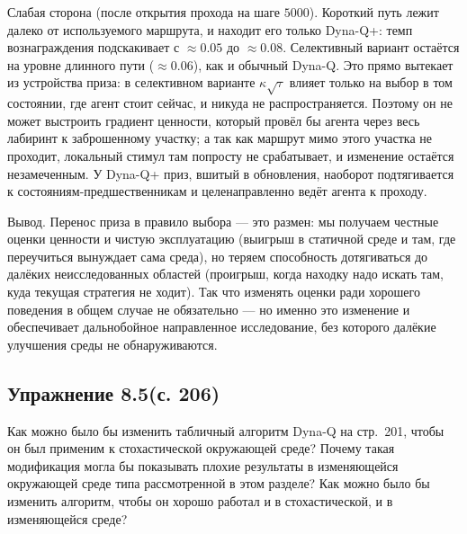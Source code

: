 \begin{solution}
    Слабая сторона (после открытия прохода на шаге $5000$). Короткий путь лежит
    далеко от используемого маршрута, и находит его только Dyna-Q+: темп
    вознаграждения подскакивает с $\approx 0.05$ до $\approx 0.08$. Селективный
    вариант остаётся на уровне длинного пути ($\approx 0.06$), как и обычный
    Dyna-Q. Это прямо вытекает из устройства приза: в селективном варианте
    $\kappa\sqrt{\tau}$ влияет только на выбор в том состоянии, где агент стоит
    сейчас, и никуда не распространяется. Поэтому он не может выстроить градиент
    ценности, который провёл бы агента через весь лабиринт к заброшенному
    участку; а так как маршрут мимо этого участка не проходит, локальный стимул
    там попросту не срабатывает, и изменение остаётся незамеченным. У Dyna-Q+
    приз, вшитый в обновления, наоборот подтягивается к состояниям-предшественникам
    и целенаправленно ведёт агента к проходу.

    Вывод. Перенос приза в правило выбора --- это размен: мы получаем честные
    оценки ценности и чистую эксплуатацию (выигрыш в статичной среде и там, где
    переучиться вынуждает сама среда), но теряем способность дотягиваться до
    далёких неисследованных областей (проигрыш, когда находку надо искать там,
    куда текущая стратегия не ходит). Так что изменять оценки ради хорошего
    поведения в общем случае не обязательно --- но именно это изменение и
    обеспечивает дальнобойное направленное исследование, без которого далёкие
    улучшения среды не обнаруживаются.
\end{solution}

\subsection{Упражнение 8.5(с. 206)}
Как можно было бы изменить табличный алгоритм Dyna-Q на стр.~201, чтобы он был
применим к стохастической окружающей среде? Почему такая модификация могла бы
показывать плохие результаты в изменяющейся окружающей среде типа рассмотренной
в этом разделе? Как можно было бы изменить алгоритм, чтобы он хорошо работал и в
стохастической, и в изменяющейся среде?

